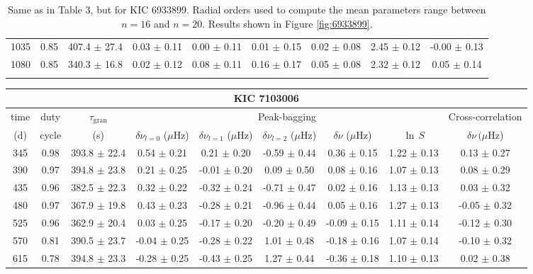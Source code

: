 \documentclass[twocolumn]{aastex61}%
\begin{document}
\begin{table*}[ht]
\begin{tabular}{ccc|ccccc|c}
1035 & 0.85 & 407.4 $\pm$ 27.4 & 0.03 $\pm$ 0.11 & 0.00 $\pm$ 0.11 & 0.01 $\pm$ 0.15 & 0.02 $\pm$ 0.08 & 2.45 $\pm$ 0.12 & -0.00 $\pm$ 0.13\\
1080 & 0.85 & 340.3 $\pm$ 16.8 & 0.02 $\pm$ 0.12 & 0.08 $\pm$ 0.11 & 0.16 $\pm$ 0.17 & 0.05 $\pm$ 0.08 & 2.32 $\pm$ 0.12 & 0.05 $\pm$ 0.14\\\vspace{-0.3cm}
\end{tabular}
\caption{Same as in Table 3, but for KIC 6933899. Radial orders used to compute the mean parameters range between $n=16$ and $n=20$. Results shown in Figure \ref{fig:6933899}.}\label{tab:6933899}\vspace{-0.1cm}
\end{table*}

\begin{table*}[ht]\centering\fontsize{9.}{7.}\selectfont
\begin{tabular}{ccc|ccccc|c}
\multicolumn{9}{c}{KIC 7103006}\\ \hline\hline
time & duty & $\tau_\text{gran}$ &\multicolumn{5}{c|}{Peak-bagging}&Cross-correlation\\
(d)& cycle & (s)&$\delta\nu_{l=0}$ ($\mu$Hz) & $\delta\nu_{l=1}$ ($\mu$Hz) & $\delta\nu_{l=2}$ ($\mu$Hz) & $\delta\nu$ ($\mu$Hz)& $\ln\,S$ & $\delta\nu\,(\mu$Hz)\\\hline
345 & 0.98 & 393.8 $\pm$ 22.4 & 0.54 $\pm$ 0.21 & 0.21 $\pm$ 0.20 & -0.59 $\pm$ 0.44 & 0.36 $\pm$ 0.15 & 1.22 $\pm$ 0.13 & 0.13 $\pm$ 0.27\\
390 & 0.97 & 394.8 $\pm$ 23.8 & 0.21 $\pm$ 0.25 & -0.01 $\pm$ 0.20 & 0.09 $\pm$ 0.50 & 0.08 $\pm$ 0.16 & 1.07 $\pm$ 0.13 & 0.08 $\pm$ 0.29\\
435 & 0.96 & 382.5 $\pm$ 22.3 & 0.32 $\pm$ 0.22 & -0.32 $\pm$ 0.24 & -0.71 $\pm$ 0.47 & 0.02 $\pm$ 0.16 & 1.13 $\pm$ 0.13 & 0.03 $\pm$ 0.32\\
480 & 0.97 & 367.9 $\pm$ 19.8 & 0.43 $\pm$ 0.23 & -0.28 $\pm$ 0.21 & -0.96 $\pm$ 0.44 & 0.05 $\pm$ 0.16 & 1.27 $\pm$ 0.13 & -0.05 $\pm$ 0.32\\
525 & 0.96 & 362.9 $\pm$ 20.4 & 0.03 $\pm$ 0.25 & -0.17 $\pm$ 0.20 & -0.20 $\pm$ 0.49 & -0.09 $\pm$ 0.15 & 1.11 $\pm$ 0.14 & -0.12 $\pm$ 0.30\\
570 & 0.81 & 390.5 $\pm$ 23.7 & -0.04 $\pm$ 0.25 & -0.28 $\pm$ 0.22 & 1.01 $\pm$ 0.48 & -0.18 $\pm$ 0.16 & 1.07 $\pm$ 0.14 & -0.10 $\pm$ 0.32\\
615 & 0.78 & 394.8 $\pm$ 23.3 & -0.28 $\pm$ 0.25 & -0.43 $\pm$ 0.25 & 1.27 $\pm$ 0.44 & -0.36 $\pm$ 0.18 & 1.10 $\pm$ 0.13 & 0.02 $\pm$ 0.38\\

\end{tabular}
\end{table*}
\end{document}
